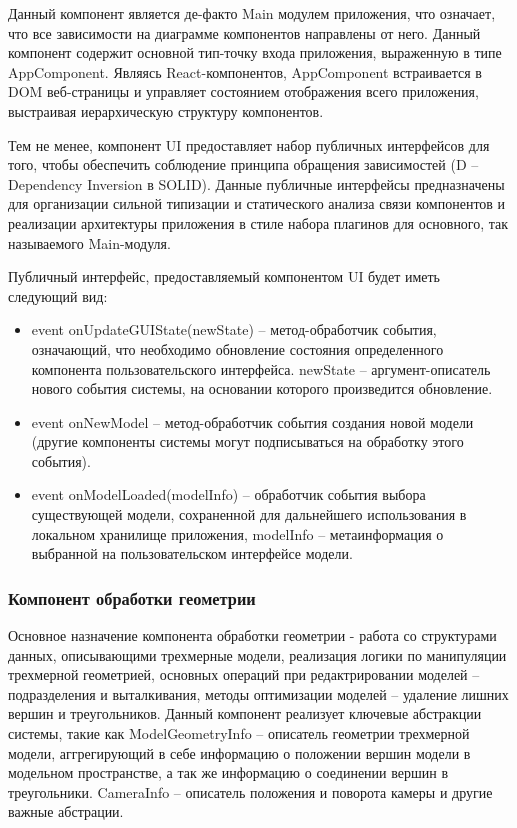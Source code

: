 Данный компонент является де-факто Main модулем приложения, что означает, что все зависимости на диаграмме компонентов направлены от него. Данный компонент содержит основной тип-точку входа
приложения, выраженную в типе AppComponent. Являясь React-компонентов, AppComponent встраивается в DOM веб-страницы и управляет состоянием отображения всего приложения, выстраивая иерархическую структуру
компонентов.

Тем не менее, компонент UI предоставляет набор публичных интерфейсов для того, чтобы обеспечить соблюдение принципа обращения зависимостей (D -- Dependency Inversion в SOLID).
Данные публичные интерфейсы предназначены для организации сильной типизации и статического анализа связи компонентов и реализации архитектуры приложения в стиле набора плагинов для основного,
так называемого Main-модуля.

Публичный интерфейс, предоставляемый компонентом UI будет иметь следующий вид:
\begin{itemize}
\item event onUpdateGUIState(newState) -- метод-обработчик события, означающий, что необходимо обновление состояния определенного компонента пользовательского
интерфейса. newState -- аргумент-описатель нового события системы, на основании которого произведится обновление.
\item event onNewModel -- метод-обработчик события создания новой модели (другие компоненты системы могут подписываться на обработку этого события).
\item event onModelLoaded(modelInfo) -- обработчик события выбора существующей модели, сохраненной для дальнейшего использования в локальном хранилище приложения, modelInfo --
метаинформация о выбранной на пользовательском интерфейсе модели.
\end{itemize}


\subsubsection{Компонент обработки геометрии}
\label{sub:theory:components:geometry}

Основное назначение компонента обработки геометрии - работа со структурами данных, описывающими трехмерные модели, реализация логики по манипуляции трехмерной геометрией,
основных операций при редактрировании моделей -- подразделения и выталкивания, методы оптимизации моделей -- удаление лишних вершин и треугольников.
Данный компонент реализует ключевые абстракции системы, такие как ModelGeometryInfo -- описатель геометрии трехмерной модели, аггрегирующий в себе информацию о положении вершин модели
в модельном пространстве, а так же информацию о соединении вершин в треугольники. CameraInfo -- описатель положения и поворота камеры и другие важные абстрации.

